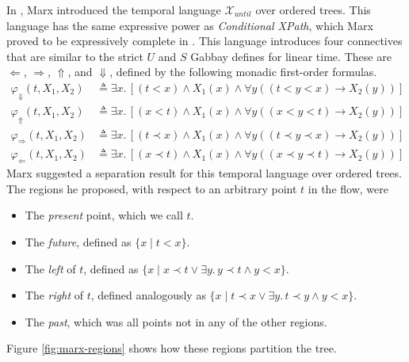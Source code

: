 \documentclass[a4paper,UKenglish,cleveref, autoref, thm-restate]{lipics-v2021}
\begin{document}
In \cite{xpathComplete}, Marx introduced the temporal language $\mathcal{X}_{until}$ over ordered trees. This language has the same expressive power as \textit{Conditional XPath}, which Marx proved to be expressively complete in \cite{marx2005conditional}. This language introduces four connectives that are similar to the strict $U$ and $S$ Gabbay defines for linear time. These are $\Leftarrow$, $\Rightarrow$, $\Uparrow$, and $\Downarrow$, defined by the following monadic first-order formulas.
\begin{equation*}
    \begin{aligned}
        \varphi_\Downarrow(t, X_1, X_2) &\triangleq \exists x.\, \left[ \left( t < x \right) \land X_1(x) \land \forall y \left( \left( t < y < x \right) \to X_2(y) \right) \right]\\
        \varphi_\Uparrow(t, X_1, X_2) &\triangleq \exists x.\, \left[ \left( x < t \right) \land X_1(x) \land \forall y \left( \left( x < y < t \right) \to X_2(y) \right) \right]\\
        \varphi_\Rightarrow(t, X_1, X_2) &\triangleq \exists x.\, \left[ \left( t \prec x \right) \land X_1(x) \land \forall y \left( \left( t \prec y \prec x \right) \to X_2(y) \right) \right]\\
        \varphi_\Leftarrow(t, X_1, X_2) &\triangleq \exists x.\, \left[ \left( x \prec t \right) \land X_1(x) \land \forall y \left( \left( x \prec y \prec t \right) \to X_2(y) \right) \right]
    \end{aligned}
\end{equation*}
Marx suggested a separation result for this temporal language over ordered trees. The regions he proposed, with respect to an arbitrary point $t$ in the flow, were
\begin{itemize} %
    \item The \textit{present} point, which we call $t$.
    \item The \textit{future}, defined as $\{x \mid t < x \}$.
    \item The \textit{left} of $t$, defined as $\{x \mid x \prec t \lor \exists y.\, y \prec t \land y < x \}$.
    \item The \textit{right} of $t$, defined analogously as $\{x \mid t \prec x \lor \exists y.\, t \prec y \land y < x \}$.
    \item The \textit{past}, which was all points not in any of the other regions.
\end{itemize}
Figure \ref{fig:marx-regions} shows how these regions partition the tree.
\end{document}
